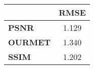 \begin{tabular}{|l|c|}
\hline
&\textbf{RMSE}\\\hline
\textbf{PSNR}&1.129\\\hline
\textbf{OURMET}&1.340\\\hline
\textbf{SSIM}&1.202\\\hline
\end{tabular}
